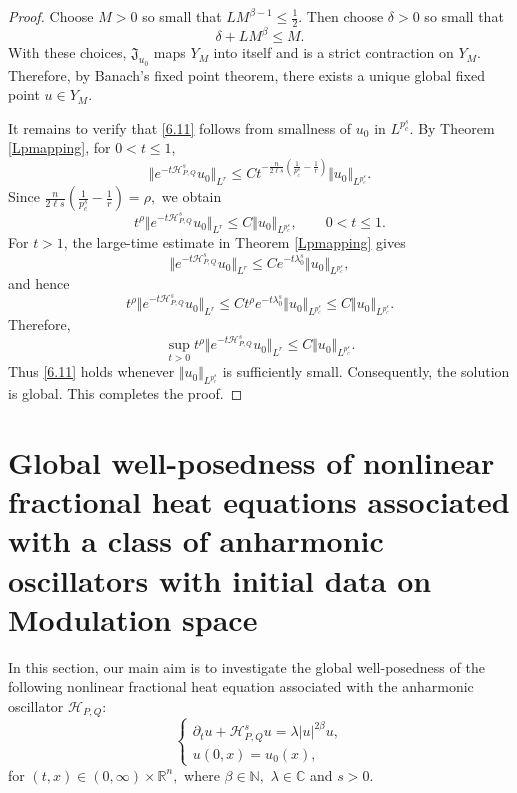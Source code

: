\documentclass[12pt, reqno]{amsart}
\theoremstyle{definition}
\theoremstyle{remark}
\numberwithin{equation}{section}
\newcommand{\APQ}{\mathcal{H}_{P, Q}}
\begin{document}
\begin{proof}
Choose $M>0$ so small that $L M^{\beta-1}\leq \frac12.$
Then choose $\delta>0$ so small that
\[
    \delta+L M^\beta\leq M.
\]
With these choices, $\mathfrak J_{u_0}$ maps $Y_M$ into itself and is a strict contraction on $Y_M$. Therefore, by Banach's fixed point theorem, there exists a unique global fixed point $u\in Y_M$.

It remains to verify that \eqref{6.11} follows from smallness of $u_0$ in $L^{p_c^s}$. By Theorem \ref{Lpmapping}, for $0<t\leq1$,
\[
    \Vert e^{-t\APQ^s}u_0\Vert_{L^r}
    \leq
    C
    t^{-\frac{n}{2\ell s}
    \left(
    \frac1{p_c^s}-\frac1r
    \right)}
    \Vert u_0\Vert_{L^{p_c^s}}.
\]
Since $\frac{n}{2\ell s}
    \left(
    \frac1{p_c^s}-\frac1r
    \right)  =
    \rho,$
we obtain
\[
    t^\rho
    \Vert e^{-t\APQ^s}u_0\Vert_{L^r}
    \leq
    C
    \Vert u_0\Vert_{L^{p_c^s}},
    \qquad 0<t\leq1.
\]
For $t>1$, the large-time estimate in Theorem \ref{Lpmapping} gives
\[
    \Vert e^{-t\APQ^s}u_0\Vert_{L^r}
    \leq
    C e^{-t\lambda_0^s}
    \Vert u_0\Vert_{L^{p_c^s}},
\]
and hence
\[
    t^\rho
    \Vert e^{-t\APQ^s}u_0\Vert_{L^r}
    \leq
    C
    t^\rho e^{-t\lambda_0^s}
    \Vert u_0\Vert_{L^{p_c^s}}
    \leq
    C
    \Vert u_0\Vert_{L^{p_c^s}}.
\]
Therefore,
\[
    \sup_{t>0}
    t^\rho
    \Vert e^{-t\APQ^s}u_0\Vert_{L^r}
    \leq
    C
    \Vert u_0\Vert_{L^{p_c^s}}.
\]
Thus \eqref{6.11} holds whenever $\Vert u_0\Vert_{L^{p_c^s}}$ is sufficiently small. Consequently, the solution is global. This completes the proof.
\end{proof}




\section{Global well-posedness of  nonlinear fractional heat equations associated with a class of anharmonic oscillators with initial data on Modulation space}\label{Modulation}
In this section, our main aim is to investigate the global well-posedness of the following nonlinear fractional heat equation associated with the anharmonic oscillator $\APQ:$
\begin{equation}
	\begin{cases}
		\partial_t u+ \APQ^s u=\lambda  |u|^{2\beta} u, \\
		u(0, x)=u_0(x),
	\end{cases}
\end{equation}
for $(t,x) \in (0, \infty) \times \mathbb{R}^n,$ where $\beta \in \mathbb{N},$ $\lambda \in \mathbb{C}$ and $s>0.$\\
\end{document}

